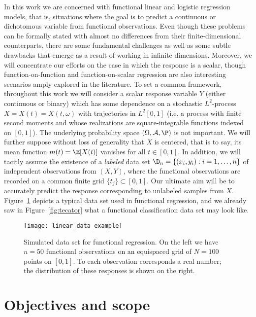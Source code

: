 In this work we are concerned with functional linear and logistic regression models, that is, situations where the goal is to predict a continuous or dichotomous variable from functional observations. Even though these problems can be formally stated with almost no differences from their finite-dimensional counterparts, there are some fundamental challenges as well as some subtle drawbacks that emerge as a result of working in infinite dimensions. Moreover, we will concentrate our efforts on the case in which the response is a scalar, though function-on-function and function-on-scalar regression are also interesting scenarios amply explored in the literature. To set a common framework, throughout this work we will consider a scalar response variable \(Y\) (either continuous or binary) which has some dependence on a stochastic \(L^2\)-process \(X=X(t)=X(t, \omega)\) with trajectories in \(L^2[0, 1]\) (i.e. a process with finite second moments and whose realizations are square-integrable functions indexed on \([0,1]\)). The underlying probability space \((\Omega, \mathcal A, \P)\) is not important. We will further suppose without loss of generality that \(X\) is centered, that is to say, its mean function \(m(t)=\E[X(t)]\) vanishes for all \(t\in[0,1]\). In addition, we will tacitly assume the existence of a \textit{labeled} data set \(\D_n =\{(x_i, y_i): i=1,\dots, n\}\) of independent observations from \((X, Y)\), where the functional observations are recorded on a common finite grid \(\{t_j\}\subset [0, 1]\). Our ultimate aim will be to accurately predict the response corresponding to unlabeled samples from \(X\). Figure~\ref{fig:linear_data_example} depicts a typical data set used in functional regression, and we already saw in Figure~\ref{fig:tecator} what a functional classification data set may look like.

\begin{figure}[ht]
  \centering
  \texttt{[image: linear\_data\_example]}
  \caption{Simulated data set for functional regression. On the left we have \(n=50\) functional observations on an equispaced grid of \(N=100\) points on \([0,1]\). To each observation corresponds a real number; the distribution of these responses is shown on the right.}\label{fig:linear_data_example}
\end{figure}


\section{Objectives and scope}

